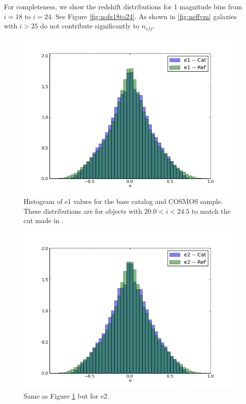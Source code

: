 \documentclass[]{article}
\begin{document}
For completeness, we show the redshift distributions for 1 magnitude bins from $i=18$ to $i=24$.  See Figure \ref{fig:nofz18to24}.  As shown in \ref{fig:neffvm}
galaxies with $i > 25$ do not contribute significantly to $n_{eff}$. 
\begin{figure}
\centering
\includegraphics[width=5in]{validation_figures/e1_hist.png}
\caption{Histogram of e1 values for the base catalog and COSMOS sample.  These distributions are for objects with $20.0 < i < 24.5$ to match
the cut made in \cite{chang}.\label{fig:ellip1}}
\end{figure}
\begin{figure}
\centering
\includegraphics[width=5in]{validation_figures/e2_hist.png}
\caption{Same as Figure \ref{fig:ellip1} but for e2.\label{fig:ellip2}}
\end{figure}
\end{document}
